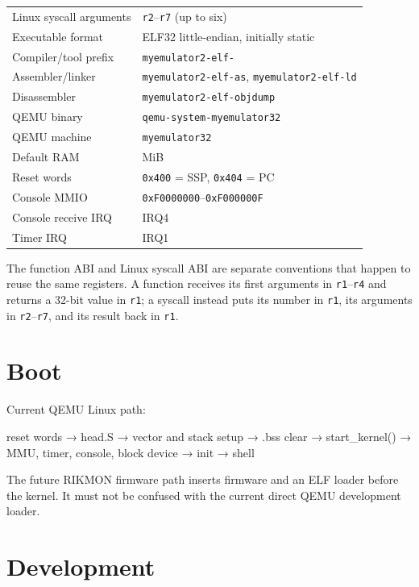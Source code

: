 \documentclass[
  oneside,
  openany]{book}
\newenvironment{Shaded}{\begin{snugshade}}{\end{snugshade}}
\newcommand{\NormalTok}[1]{#1}
\begin{document}
\begin{longtable}[]{@{}
  >{\raggedright\arraybackslash}p{}
  >{\raggedright\arraybackslash}p{}@{}}
Linux syscall arguments & \texttt{r2}--\texttt{r7} (up to six) \\
Executable format & ELF32 little-endian, initially static \\
Compiler/tool prefix & \texttt{myemulator2-elf-} \\
Assembler/linker & \texttt{myemulator2-elf-as},
\texttt{myemulator2-elf-ld} \\
Disassembler & \texttt{myemulator2-elf-objdump} \\
QEMU binary & \texttt{qemu-system-myemulator32} \\
QEMU machine & \texttt{myemulator32} \\
Default RAM & 16 MiB \\
Reset words & \texttt{0x400} = SSP, \texttt{0x404} = PC \\
Console MMIO & \texttt{0xF0000000}--\texttt{0xF000000F} \\
Console receive IRQ & IRQ4 \\
Timer IRQ & IRQ1 \\
\end{longtable}

The function ABI and Linux syscall ABI are separate conventions that
happen to reuse the same registers. A function receives its first
arguments in \texttt{r1}--\texttt{r4} and returns a 32-bit value in
\texttt{r1}; a syscall instead puts its number in \texttt{r1}, its
arguments in \texttt{r2}--\texttt{r7}, and its result back in
\texttt{r1}.

\hypertarget{boot}{%
\section{Boot}\label{boot}}

Current QEMU Linux path:

\begin{Shaded}
\begin{Highlighting}[]
\NormalTok{reset words}
\NormalTok{    → head.S}
\NormalTok{    → vector and stack setup}
\NormalTok{    → .bss clear}
\NormalTok{    → start\_kernel()}
\NormalTok{    → MMU, timer, console, block device}
\NormalTok{    → init}
\NormalTok{    → shell}
\end{Highlighting}
\end{Shaded}

The future RIKMON firmware path inserts firmware and an ELF loader
before the kernel. It must not be confused with the current direct QEMU
development loader.

\hypertarget{development}{%
\section{Development}\label{development}}
\end{document}
